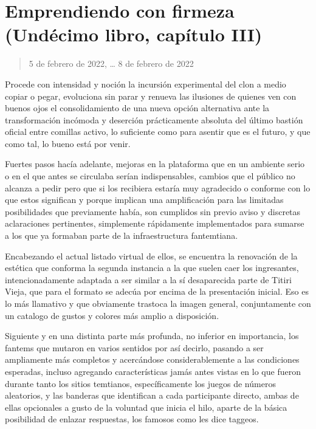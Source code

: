 \documentclass[
]{book}
\begin{document}
\hypertarget{emprendiendo-con-firmeza-unduxe9cimo-libro-capuxedtulo-iii}{%
\section{Emprendiendo con firmeza (Undécimo libro, capítulo III)}\label{emprendiendo-con-firmeza-unduxe9cimo-libro-capuxedtulo-iii}}

\begin{quote}
5 de febrero de 2022, \ldots{} 8 de febrero de 2022
\end{quote}

Procede con intensidad y noción la incursión experimental del clon a medio copiar o pegar, evoluciona sin parar y renueva las ilusiones de quienes ven con buenos ojos el consolidamiento de una nueva opción alternativa ante la transformación incómoda y deserción prácticamente absoluta del último bastión oficial entre comillas activo, lo suficiente como para asentir que es el futuro, y que como tal, lo bueno está por venir.

Fuertes pasos hacía adelante, mejoras en la plataforma que en un ambiente serio o en el que antes se circulaba serían indispensables, cambios que el público no alcanza a pedir pero que si los recibiera estaría muy agradecido o conforme con lo que estos significan y porque implican una amplificación para las limitadas posibilidades que previamente había, son cumplidos sin previo aviso y discretas aclaraciones pertinentes, simplemente rápidamente implementados para sumarse a los que ya formaban parte de la infraestructura fantemtiana.

Encabezando el actual listado virtual de ellos, se encuentra la renovación de la estética que conforma la segunda instancia a la que suelen caer los ingresantes, intencionadamente adaptada a ser similar a la sí desaparecida parte de Titiri Vieja, que para el formato se adecúa por encima de la presentación inicial. Eso es lo más llamativo y que obviamente trastoca la imagen general, conjuntamente con un catalogo de gustos y colores más amplio a disposición.

Siguiente y en una distinta parte más profunda, no inferior en importancia, los fantems que mutaron en varios sentidos por así decirlo, pasando a ser ampliamente más completos y acercándose considerablemente a las condiciones esperadas, incluso agregando características jamás antes vistas en lo que fueron durante tanto los sitios temtianos, específicamente los juegos de números aleatorios, y las banderas que identifican a cada participante directo, ambas de ellas opcionales a gusto de la voluntad que inicia el hilo, aparte de la básica posibilidad de enlazar respuestas, los famosos como les dice taggeos.
\end{document}
